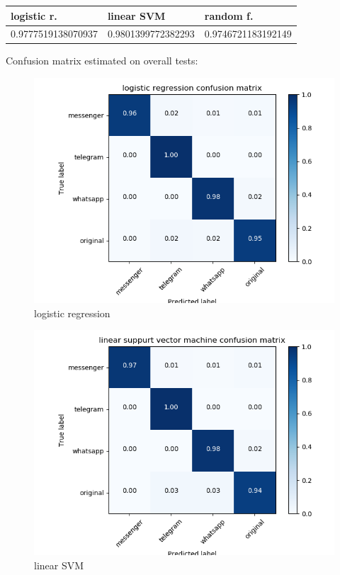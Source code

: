  {\def\arraystretch{1.3} 
 \begin{table}[H] 
\centering 
\begin{tabular}{|l|l|l|} 
\hline 
logistic r.  &linear SVM  &random f.  \\ \hline
0.9777519138070937  &0.9801399772382293  &0.9746721183192149  \\ \hline
\end{tabular} 
\end{table} }
Confusion matrix estimated on overall tests: 

 \begin{figure}[H] 
\centering 
\includegraphics[scale=.6]{images/logistic_total.png} 
\caption{logistic regression} 
\end{figure} 

 \begin{figure}[H] 
\centering 
\includegraphics[scale=.6]{images/lsvm_total.png} 
\caption{linear SVM} 
\end{figure} 

